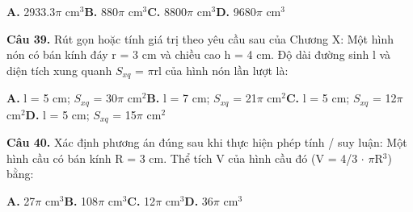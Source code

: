 \documentclass[11pt,a4paper]{article}
\begin{document}
\hspace*{1.5em}\textbf{A.} 2933.3$\pi$ cm$^3$\quad\quad \textbf{B.} 880$\pi$ cm$^3$\quad\quad \textbf{C.} 8800$\pi$ cm$^3$\quad\quad \textbf{D.} 9680$\pi$ cm$^3$\par\vspace{2pt}
\textbf{\color{primary} Câu 39.} Rút gọn hoặc tính giá trị theo yêu cầu sau của Chương X: Một hình nón có bán kính đáy r = 3 cm và chiều cao h = 4 cm. Độ dài đường sinh l và diện tích xung quanh $S_{xq}$ = $\pi$rl của hình nón lần lượt là:\par
\hspace*{1.5em}\textbf{A.} l = 5 cm; $S_{xq}$ = 30$\pi$ cm$^2$\quad\quad \textbf{B.} l = 7 cm; $S_{xq}$ = 21$\pi$ cm$^2$\quad\quad \textbf{C.} l = 5 cm; $S_{xq}$ = 12$\pi$ cm$^2$\quad\quad \textbf{D.} l = 5 cm; $S_{xq}$ = 15$\pi$ cm$^2$\par\vspace{2pt}
\textbf{\color{primary} Câu 40.} Xác định phương án đúng sau khi thực hiện phép tính / suy luận: Một hình cầu có bán kính R = 3 cm. Thể tích V của hình cầu đó (V = 4/3 $\cdot$ $\pi$R$^3$) bằng:\par
\hspace*{1.5em}\textbf{A.} 27$\pi$ cm$^3$\quad\quad \textbf{B.} 108$\pi$ cm$^3$\quad\quad \textbf{C.} 12$\pi$ cm$^3$\quad\quad \textbf{D.} 36$\pi$ cm$^3$\par\vspace{2pt}
\end{document}
